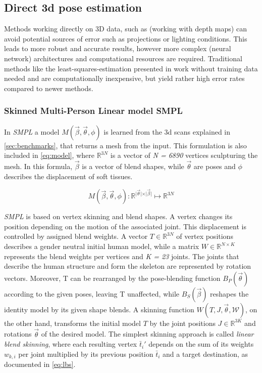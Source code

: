 \subsection{Direct 3d pose estimation}
Methods working directly on 3D data, such as \cite{Ye2011} (working with depth maps) can avoid potential sources of error such as projections or lighting conditions. This leads to more robust and accurate results, however more complex (neural network) architectures and computational resources are required. Traditional methods like the least-squares-estimation presented in \cite{Haralick98} work without training data needed and are computationally inexpensive, but yield rather high error rates compared to newer methods.

\subsubsection{Skinned Multi-Person Linear model SMPL}
\label{sec:SMPL}
In \emph{SMPL} a model $M(\vec{\beta},\vec{\theta},\phi)$ is learned from the 3d scans explained in \autoref{sec:benchmarks}, that returns a mesh from the input. This formulation is also included in \autoref{eq:model}, where $\mathbb{R}^{3N}$ is a vector of \emph{N = 6890} vertices sculpturing the mesh. In this formula, $\vec{\beta}$ is a vector of blend shapes, while $\vec{\theta}$ are poses and $\phi$ describes the displacement of soft tissues.

\begin{equation}
\label{eq:model}
M(\vec{\beta},\vec{\theta},\phi) : \mathbb{R}^{\vert \vec{\theta} \vert \times \vert \vec{\beta} \vert} \mapsto \mathbb{R}^{3N}
\end{equation}

\emph{SMPL} is based on vertex skinning and blend shapes. A vertex changes its position depending on the motion of the associated joint. This displacement is controlled by assigned blend weights. A vector $T \in \mathbb{R}^{3N}$ of vertex positions describes a gender neutral initial human model, while a matrix $W \in \mathbb{R}^{N \times K}$ represents the blend weights per vertices and \emph{K = 23} joints. The joints that describe the human structure and form the skeleton are represented by rotation vectors. Moreover, T can be rearranged by the pose-blending function $B_{P}(\vec{\theta})$ according to the given poses, leaving T unaffected, while $B_{S}(\vec{\beta})$ reshapes the identity model by its given shape blends. A skinning function $W(T,J,\vec{\theta},\mathcal{W})$, on the other hand, transforms the initial model $T$ by the joint positions $J \in \mathbb{R}^{3K}$ and rotations $\vec{\theta}$ of the desired model. The simplest skinning approach is called \emph{linear blend skinning}, where each resulting vertex $\bar{t}_{i}'$ depends on the sum of its weights $w_{k,i}$ per joint multiplied by its previous position $\bar{t}_{i}$ and a target destination, as documented in \autoref{eq:lbs}. 


